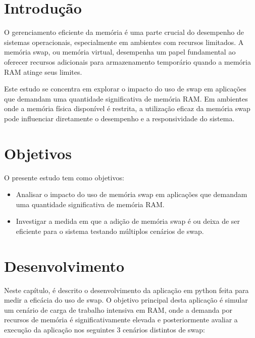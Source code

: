 \documentclass[
	12pt,				%
	openright,			%
	oneside,			%
	a4paper,			%
	chapter=TITLE,		%
	english,			%
	french,				%
	spanish,			%
	brazil				%
	]{abntex2}
\theoremstyle{definition}
\begin{document}

\chapter{Introdução}

O gerenciamento eficiente da memória é uma parte crucial do desempenho de sistemas operacionais, 
especialmente em ambientes com recursos limitados. A memória swap, ou memória virtual, desempenha um papel fundamental ao 
oferecer recursos adicionais para armazenamento temporário quando a memória RAM atinge seus limites.

Este estudo se concentra em explorar o impacto do uso de swap em aplicações que demandam 
uma quantidade significativa de memória RAM. Em ambientes onde a memória física disponível 
é restrita, a utilização eficaz da memória swap pode influenciar diretamente o desempenho 
e a responsividade do sistema.

\chapter{Objetivos}

O presente estudo tem como objetivos:

\begin{itemize}
    \item Analisar o impacto do uso de memória swap em aplicações que demandam uma quantidade significativa de memória RAM.
    \item Investigar a medida em que a adição de memória swap é ou deixa de ser eficiente para o sistema testando múltiplos cenários de swap.
\end{itemize}


\chapter{Desenvolvimento} \label{chap:des}

Neste capítulo, é descrito o desenvolvimento da aplicação em python feita para medir a eficácia do uso de swap. 
O objetivo principal desta aplicação é simular um cenário de carga de trabalho intensiva em 
RAM, onde a demanda por recursos de memória é significativamente elevada e posteriormente avaliar a 
execução da aplicação nos seguintes 3 cenários distintos de swap:
\end{document}
